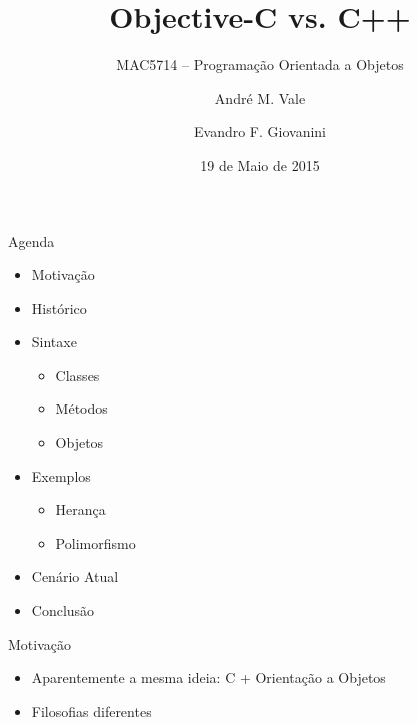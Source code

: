 \documentclass[compress]{beamer}
\title{Objective-C vs. C++}
\subtitle{MAC5714 – Programação Orientada a Objetos}
\author{André M. Vale\\ \and  Evandro F. Giovanini}
\institute[USP] %
{
  Departamento de Ciências da Computação\\
  Universidade de São Paulo
}
\date{19 de Maio de 2015}
\begin{document}
\begin{frame}
  \titlepage
\end{frame}

\begin{frame}{Agenda}
  \begin{itemize}
  \item { Motivação }
  \item { Histórico }
  \item { Sintaxe }
  \begin{itemize}
    \item { Classes }
    \item { Métodos }
    \item { Objetos }
  \end{itemize}
  \item { Exemplos }
  \begin{itemize}
    \item { Herança }
    \item { Polimorfismo }
  \end{itemize}
  \item { Cenário Atual }
  \item { Conclusão }
  \end{itemize}
\end{frame}

\begin{frame}{Motivação}
  \begin{itemize}
  \item {
    Aparentemente a mesma ideia: C + Orientação a Objetos
  }
  \item {
    Filosofias diferentes
  }
  \end{itemize}
\end{frame}
\end{document}
